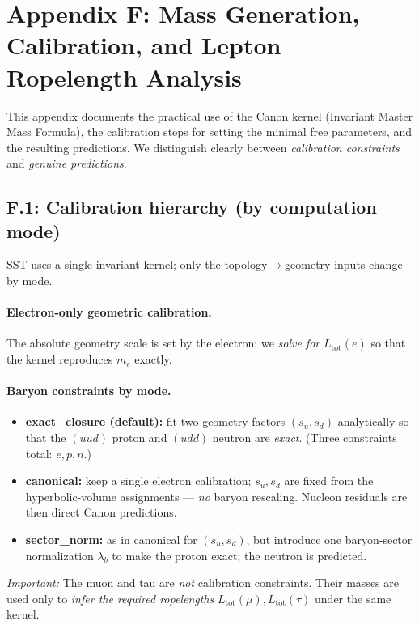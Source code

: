 \section*{Appendix F: Mass Generation, Calibration, and Lepton Ropelength Analysis}
\label{sec:calibration_hierarchy}

This appendix documents the practical use of the Canon kernel (Invariant Master Mass Formula), the calibration steps for setting the minimal free parameters, and the resulting predictions. We distinguish clearly between \emph{calibration constraints} and \emph{genuine predictions}.

\subsection*{F.1: Calibration hierarchy (by computation mode)}
SST uses a single invariant kernel; only the topology\(\to\)geometry inputs change by mode.

\paragraph{Electron-only geometric calibration.}
The absolute geometry scale is set by the electron: we \emph{solve for} \(L_{\text{tot}}(e)\) so that the kernel reproduces \(m_e\) exactly.

\paragraph{Baryon constraints by mode.}
\begin{itemize}
	\item \textbf{exact\_closure (default):} fit two geometry factors \((s_u,s_d)\) analytically so that the \((uud)\) proton and \((udd)\) neutron are \emph{exact}. (Three constraints total: \(e,p,n\).)
	\item \textbf{canonical:} keep a single electron calibration; \(s_u,s_d\) are fixed from the hyperbolic-volume assignments — \emph{no} baryon rescaling. Nucleon residuals are then direct Canon predictions.
	\item \textbf{sector\_norm:} as in canonical for \((s_u,s_d)\), but introduce one baryon-sector normalization \(\lambda_b\) to make the proton exact; the neutron is predicted.
\end{itemize}

\emph{Important:} The muon and tau are \emph{not} calibration constraints. Their masses are used only to \emph{infer the required ropelengths} \(L_{\text{tot}}(\mu),L_{\text{tot}}(\tau)\) under the same kernel.

